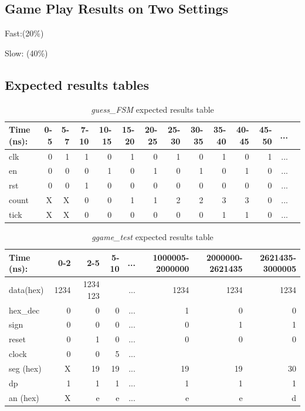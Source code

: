 \documentclass[11pt]{article}
\begin{document}
\subsection*{Game Play Results on Two Settings}
Fast:(20\%)

Slow: (40\%)

\subsection*{Expected results tables}

\begin{table}[ht]\centering
	\caption{\textit{guess\_FSM} expected results table}
	\label{ALU:tbl:alu_ERT}\medskip
	\begin{tabular}{l|rrrrrrrrrrrrr}
		Time (ns): & 0-5 & 5-7 & 7-10 & 10-15 & 15-20 & 20-25 & 25-30 & 30-35 & 35-40 & 40-45 & 45-50 &...\\
		\midrule
		clk & 0  & 1 & 1 & 0 & 1 & 0 & 1 & 0 & 1 & 0 & 1 & ... \\
		en & 0 & 0 & 0 & 1 & 0 & 1 & 0 & 1 & 0 & 1 & 0 & ...\\
		rst & 0 & 0 & 1& 0 & 0 & 0 & 0 & 0 & 0 & 0 & 0 & ... \\
		\midrule
		count & X & X & 0 & 0  & 1 & 1 & 2 & 2 & 3 & 3 & 0 & ... \\
		tick & X & X & 0 & 0 & 0 & 0 & 0 & 0 & 1 & 1 & 0& ... \\
		\bottomrule
	\end{tabular}
\end{table}

\begin{table}[ht]\centering
	\caption{\textit{ggame\_test} expected results table}
	\label{ALU:tbl:alu_ERT}\medskip
	\begin{tabular}{l|rrrrrrr}
		Time (ns): & 0-2 & 2-5 & 5-10 & ... & 1000005-2000000 & 2000000-2621435 & 2621435-3000005\\
		\midrule
		data(hex) & 1234 & 1234 123 && ... & 1234  & 1234 & 1234  \\
		hex\_dec & 0 & 0 & 0 & ... & 1 &  0 & 0\\
		sign & 0 & 0 & 0 & ... & 0 &  1 & 1 \\
		reset & 0 & 1 & 0 & ... & 0 & 0 & 0  \\
		clock & 0 & 0 & 5 & ...  \\
		\midrule
		seg (hex) & X & 19 & 19 & ... & 19 & 19 & 30 \\
		dp & 1 & 1 & 1 & ... & 1 & 1 & 1 \\
		an (hex)& X & e & e & ... & e & e & d \\
		\bottomrule
	\end{tabular}
\end{table}
\end{document}
